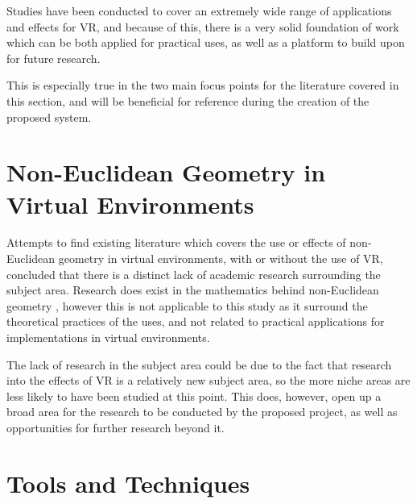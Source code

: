 			Studies have been conducted to cover an extremely wide range of applications and effects for VR, and because of this, there is a very solid foundation of work which can be both applied for practical uses, as well as a platform to build upon for future research.

			This is especially true in the two main focus points for the literature covered in this section, and will be beneficial for reference during the creation of the proposed system.


	\section{Non-Euclidean Geometry in Virtual Environments}
	\label{lr:ne}

		Attempts to find existing literature which covers the use or effects of non-Euclidean geometry in virtual environments, with or without the use of VR, concluded that there is a distinct lack of academic research surrounding the subject area.
		Research does exist in the mathematics behind non-Euclidean geometry \cite{Maric2014} \cite{Turner2009}, however this is not applicable to this study as it surround the theoretical practices of the uses, and not related to practical applications for implementations in virtual environments.

		The lack of research in the subject area could be due to the fact that research into the effects of VR is a relatively new subject area, so the more niche areas are less likely to have been studied at this point.
		This does, however, open up a broad area for the research to be conducted by the proposed project, as well as opportunities for further research beyond it.

	\section{Tools and Techniques}
	\label{lr:tools}

